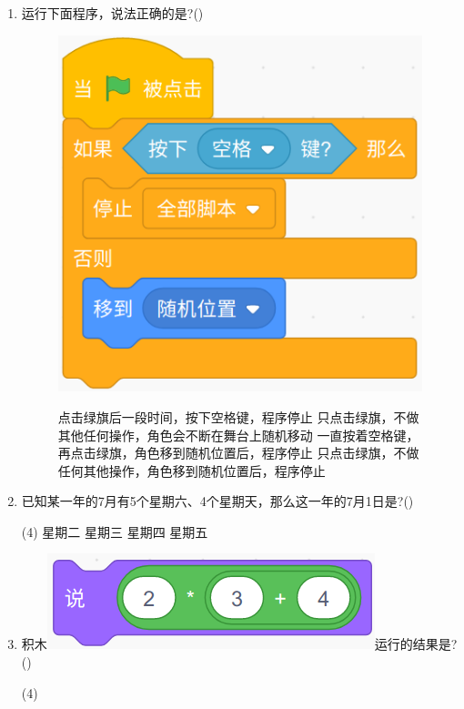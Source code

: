 \documentclass[10pt, a4paper]{article}
\begin{document}
\begin{enumerate}
        \item 运行下面程序，说法正确的是?(\qquad)
        \begin{figure}[htbp]
            \begin{minipage}{.3\textwidth}
                \centering
                \includegraphics[width=.6\textwidth]{23.png}
            \end{minipage}
            \begin{minipage}{.68\textwidth}
                \begin{tasks}
                    \task 点击绿旗后一段时间，按下空格键，程序停止
                    \task 只点击绿旗，不做其他任何操作，角色会不断在舞台上随机移动
                    \task 一直按着空格键，再点击绿旗，角色移到随机位置后，程序停止
                    \task 只点击绿旗，不做任何其他操作，角色移到随机位置后，程序停止
                \end{tasks}
            \end{minipage}
        \end{figure}

        \item 已知某一年的7月有5个星期六、4个星期天，那么这一年的7月1日是?(\qquad)
        \begin{tasks}(4)
            \task 星期二
            \task 星期三
            \task 星期四
            \task 星期五
        \end{tasks}

        \item 积木\includegraphics[width=.15\textwidth]{25.png}运行的结果是?(\qquad)
        \begin{tasks}(4)
        \end{tasks}
    \end{enumerate}
\end{document}
